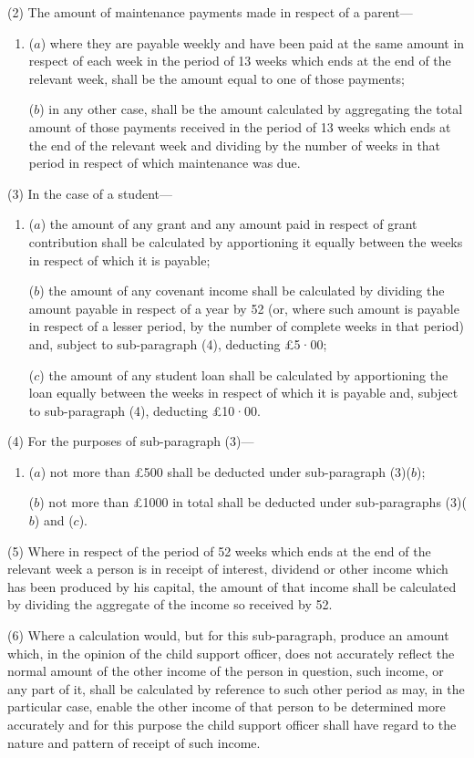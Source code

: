 \documentclass[a4paper]{article}
\begin{document}
(2) The amount of maintenance payments made in respect of a parent—
\begin{enumerate}\item[]
($a$) where they are payable weekly and have been paid at the same amount in respect of each week in the period of 13 weeks which ends at the end of the relevant week, shall be the amount equal to one of those payments;

($b$) in any other case, shall be the amount calculated by aggregating the total amount of those payments received in the period of 13 weeks which ends at the end of the relevant week and dividing by the number of weeks in that period in respect of which maintenance was due.
\end{enumerate}

(3) In the case of a student—
\begin{enumerate}\item[]
($a$) the amount of any grant and any amount paid in respect of grant contribution shall be calculated by apportioning it equally between the weeks in respect of which it is payable;

($b$) the amount of any covenant income shall be calculated by dividing the amount payable in respect of a year by 52 (or, where such amount is payable in respect of a lesser period, by the number of complete weeks in that period) and, subject to sub-paragraph (4), deducting £5·00;

($c$) the amount of any student loan shall be calculated by apportioning the loan equally between the weeks in respect of which it is payable and, subject to sub-paragraph (4), deducting £10·00.
\end{enumerate}

(4) For the purposes of sub-paragraph (3)—
\begin{enumerate}\item[]
($a$) not more than £500 shall be deducted under sub-paragraph (3)($b$);

($b$) not more than £1000 in total shall be deducted under sub-paragraphs (3)($b$) and ($c$).
\end{enumerate}

(5) Where in respect of the period of 52 weeks which ends at the end of the relevant week a person is in receipt of interest, dividend or other income which has been produced by his capital, the amount of that income shall be calculated by dividing the aggregate of the income so received by 52.

(6) Where a calculation would, but for this sub-paragraph, produce an amount which, in the opinion of the child support officer, does not accurately reflect the normal amount of the other income of the person in question, such income, or any part of it, shall be calculated by reference to such other period as may, in the particular case, enable the other income of that person to be determined more accurately and for this purpose the child support officer shall have regard to the nature and pattern of receipt of such income.
\end{document}
